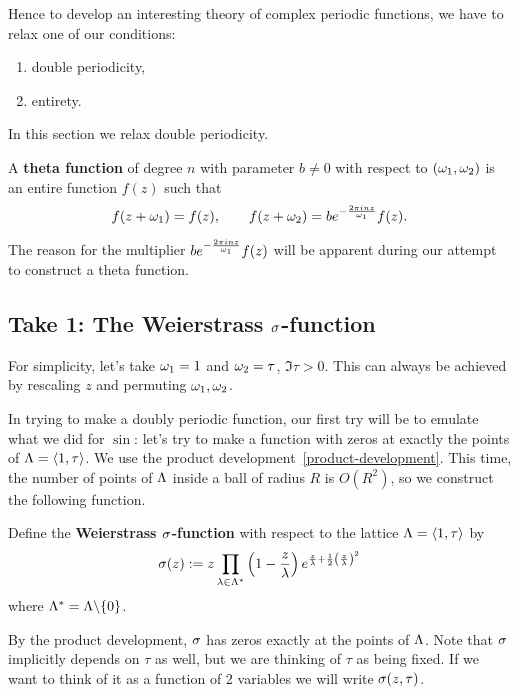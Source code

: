 Hence to develop an interesting theory of complex periodic functions, we have to relax one of our conditions:
\begin{enumerate}
\item
double periodicity,
\item
entirety.
\end{enumerate}
In this section we relax double periodicity.
\begin{df}
A \textbf{theta function} of degree $n$ with parameter $b\ne 0$ with respect to $(\omega_1,\omega_2)$ is an entire function $f(z)$ such that
\[
f(z+\omega_1)=f(z),\qquad f(z+\omega_2)=be^{-\frac{2\pi i nz}{\omega_1}} f(z).
\]
\end{df}
The reason for the multiplier $be^{-\frac{2\pi i nz}{\omega_1}} f(z)$ will be apparent during our attempt to construct a theta function.

\subsection{Take 1: The Weierstrass $\sigma$-function}
For simplicity, let's take $\omega_1=1$ and $\omega_2=\tau$, $\Im \tau>0$. This can always be achieved by rescaling $z$ and permuting $\omega_1,\omega_2$. 

In trying to make a doubly periodic function, our first try will be to emulate what we did for $\sin$: let's try to make a function with zeros at exactly the points of $\Lambda=\left\langle {1,\tau}\right\rangle$. We use the product development~\ref{product-development}. This time, the number of points of $\Lambda$ inside a ball of radius $R$ is $O(R^2)$, so we construct the following function.
\begin{df}
Define the \textbf{Weierstrass $\sigma$-function} with respect to the lattice $\Lambda=\left\langle {1,\tau}\right\rangle$ by
\[
\sigma(z):=z\prod_{\lambda\in \Lambda^*}\left( {1-\frac{z}{\lambda}} \right)e^{\frac{z}{\lambda} +\frac{1}{2}\left( {\frac{z}{\lambda}} \right)^2}
\]
where $\Lambda^*=\Lambda\backslash \{0\}$.
\end{df}
By the product development, $\sigma$ has zeros exactly at the points of $\Lambda$. Note that $\sigma$ implicitly depends on $\tau$ as well, but we are thinking of $\tau$ as being fixed. If we want to think of it as a function of 2 variables we will write $\sigma(z,\tau)$.

